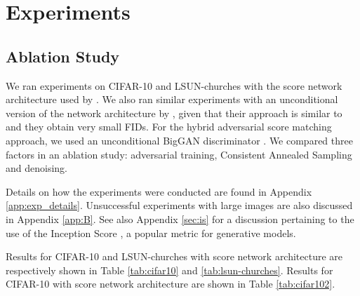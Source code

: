 \documentclass{article} \usepackage{iclr2021_conference_notitle,times}
\theoremstyle{definition}
\theoremstyle{definition}
\begin{document}
\section{Experiments}\label{sec:experiments}

\subsection{Ablation Study}\label{sec:quality}

We ran experiments on CIFAR-10 
\citep{krizhevsky2009learning} and LSUN-churches 
\citep{yu2015lsun} with the score network architecture used by \citet{song2020improved}. We also ran similar experiments with an unconditional version of the network architecture by \citet{ho2020denoising}, given that their approach is similar to \citet{song2019generative} and they obtain very small FIDs.
For the hybrid adversarial score matching approach, we used an unconditional BigGAN discriminator \citep{brock2018large}.
We compared three factors in an ablation study: adversarial training, Consistent Annealed Sampling and denoising.

Details on how the experiments were conducted are found in Appendix \ref{app:exp_details}. Unsuccessful experiments with large images are also discussed in Appendix \ref{app:B}. See also Appendix \ref{sec:is} for a discussion pertaining to the use of the Inception Score \citep{heusel2017gans}, a popular metric for generative models.

Results for CIFAR-10 and LSUN-churches with \citet{song2019generative} score network architecture are respectively shown in Table \ref{tab:cifar10} and \ref{tab:lsun-churches}. Results for CIFAR-10 with \citet{ho2020denoising} score network architecture are shown in Table \ref{tab:cifar102}.
\end{document}
